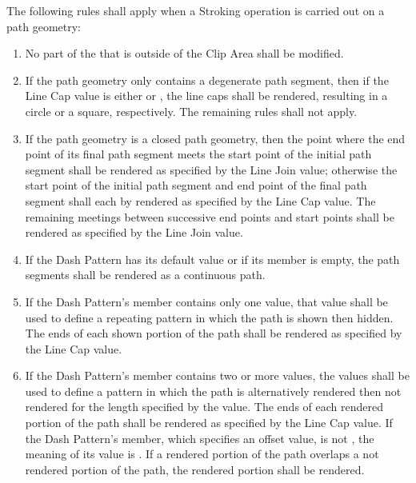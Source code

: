 \pnum
The following rules shall apply when a Stroking operation is carried out on a path geometry:
\begin{enumerate}
\item No part of the \underlyingsurface that is outside of the Clip Area shall be modified.

\item If the path geometry only contains a degenerate path segment, then if the Line Cap value is either  or , the line caps shall be rendered, resulting in a circle or a square, respectively. The remaining rules shall not apply.

\item If the path geometry is a closed path geometry, then the point where the end point of its final path segment meets the start point of the initial path segment shall be rendered as specified by the Line Join value; otherwise the start point of the initial path segment and end point of the final path segment shall each by rendered as specified by the Line Cap value. The remaining meetings between successive end points and start points shall be rendered as specified by the Line Join value.

\item If the Dash Pattern has its default value or if its  member is empty, the path segments shall be rendered as a continuous path.

\item If the Dash Pattern's  member contains only one value, that value shall be used to define a repeating pattern in which the path is shown then hidden. The ends of each shown portion of the path shall be rendered as specified by the Line Cap value.

\item If the Dash Pattern's  member contains two or more values, the values shall be used to define a pattern in which the path is alternatively rendered then not rendered for the length specified by the value. The ends of each rendered portion of the path shall be rendered as specified by the Line Cap value. If the Dash Pattern's  member, which specifies an offset value, is not , the meaning of its value is . If a rendered portion of the path overlaps a not rendered portion of the path, the rendered portion shall be rendered.
\end{enumerate}

